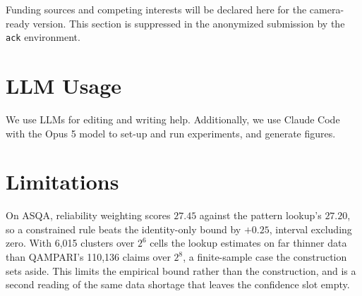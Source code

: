 \documentclass{article}
\begin{document}
\begin{ack}
Funding sources and competing interests will be declared here for the camera-ready
version. This section is suppressed in the anonymized submission by the
\texttt{ack} environment.
\end{ack}

%
%


{\small}

\newpage
\appendix

\section{LLM Usage}

We use LLMs for editing and writing help. Additionally, we use Claude Code with the Opus 5 model to set-up and run experiments, and generate figures.

\section{Limitations}
\label{sec:limitations}

On ASQA, reliability weighting scores $27.45$ against the pattern lookup's $27.20$, so a constrained rule beats the identity-only bound by $+0.25$, interval excluding zero. With 6,015 clusters over $2^6$ cells the lookup estimates on far thinner data than QAMPARI's 110,136 claims over $2^8$, a finite-sample case the construction sets aside. This limits the empirical bound rather than the construction, and is a second reading of the same data shortage that leaves the confidence slot empty. %
\end{document}
